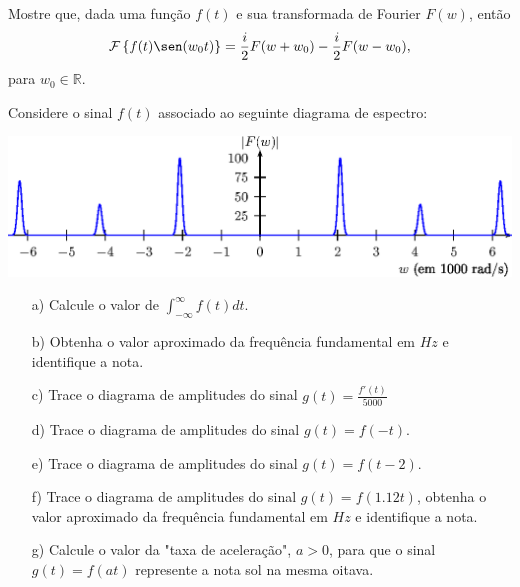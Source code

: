 \begin{exer}{\label{ex_mod_sin}}Mostre que, dada uma função $f(t)$ e sua transformada de Fourier $F(w)$, então
\begin{equation}
\mathcal{F}\left\{f(t)\sen(w_0t) \right\}=\frac{i}{2}F(w+w_0)-\frac{i}{2 }F(w-w_0),
\end{equation}
para $w_0\in\mathbb{R}$.
\end{exer}
\begin{exer} Considere o sinal $f(t)$ associado ao seguinte diagrama de espectro:
\begin{center}
\includegraphics{cap_propriedades_transformada/pics/figura_21}\end{center}
\begin{itemize}
\item[a)] Calcule o valor de $\int_{-\infty}^\infty f(t) dt$.
\item[b)] Obtenha o valor aproximado da frequência fundamental em $Hz$ e identifique a nota.
\item[c)] Trace o diagrama de amplitudes do sinal $g(t)=\frac{f'(t)}{5000}$
\item[d)] Trace o diagrama de amplitudes do sinal $g(t)=f(-t)$.
\item[e)] Trace o diagrama de amplitudes do sinal $g(t)=f(t-2)$.
\item[f)] Trace o diagrama de amplitudes do sinal $g(t)=f(1.12t)$, obtenha o valor aproximado da frequência fundamental em $Hz$ e identifique a nota.
\item[g)] Calcule o valor da "taxa de aceleração", $a>0$, para que o sinal $g(t)=f(at)$ represente a nota sol na mesma oitava.
\end{itemize}
\end{exer}
